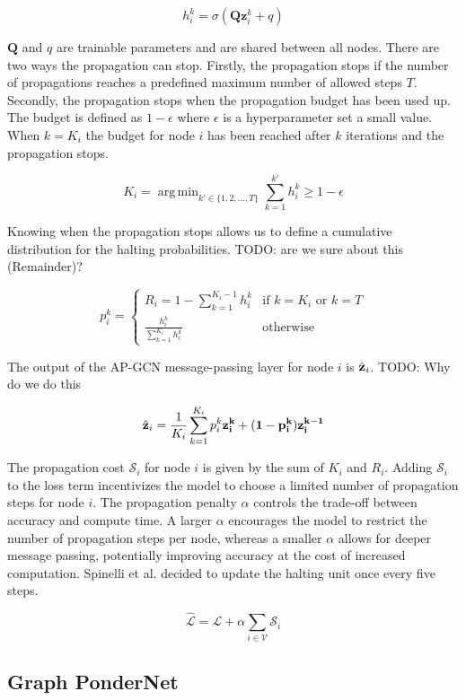 \documentclass{gdl}
\DeclareMathOperator*{\argmin}{arg\,min}
\begin{document}
$$ h^k_i = \sigma(\textbf{Q}\textbf{z}^k_i + q) $$

\noindent $\textbf{Q}$ and $q$ are trainable parameters and are shared between all nodes. There are two ways the propagation can stop. Firstly, the propagation stops if the number of propagations reaches a predefined maximum number of allowed steps $T$. Secondly, the propagation stops when the propagation budget has been used up. The budget is defined as $1-\epsilon$ where $\epsilon$ is a hyperparameter set a small value. When $k=K_i$ the budget for node $i$ has been reached after $k$ iterations and the propagation stops. 

$$ K_i = \argmin_{k' \in \{1, 2, ..., T\}} \sum_{k=1}^{k'} h_i^k \geq 1-\epsilon $$

\noindent Knowing when the propagation stops allows us to define a cumulative distribution for the halting probabilities. TODO: are we sure about this (Remainder)?

\[
    p_i^k = 
    \begin{cases}
    R_i = 1 - \sum_{k=1}^{K_i - 1} h_i^k & \text{if } k = K_i \text{ or } k = T \\
    \frac{h_i^k}{\sum_{k=1}^{K_i} h_i^k} & \text{otherwise}
    \end{cases}
\]

\noindent The output of the AP-GCN message-passing layer for node $i$ is $\hat{\bf{z}}_i$. TODO: Why do we do this

$$ \hat{\bf{z}}_i = \frac{1}{K_i} \sum_{k=1}^{K_i} p_i^k \bf{z}^k_i + (1-p^k_i) \bf{z}_i^{k-1} $$

\noindent The propagation cost $\mathcal{S}_i$ for node $i$ is given by the sum of $K_i$ and $R_i$. Adding $\mathcal{S}_i$ to the loss term incentivizes the model to choose a limited number of propagation steps for node $i$. The propagation penalty $\alpha$ controls the trade-off between accuracy and compute time. A larger $\alpha$ encourages the model to restrict the number of propagation steps per node, whereas a smaller $\alpha$ allows for deeper message passing, potentially improving accuracy at the cost of increased computation. Spinelli et al. decided to update the halting unit once every five steps. 

$$ \mathcal{\hat{L}} = \mathcal{L} + \alpha \sum_{i\in \mathcal{V}} \mathcal{S}_i $$


\subsection{Graph PonderNet}
\end{document}
